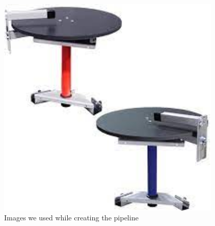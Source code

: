 \begin{figure}[htp]
\centering
\includegraphics[width=0.95\textwidth, angle=0]{Meetings/January/01-21-22/1.21.22 carousel posts - James Hu.jpeg}
\caption{Images we used while creating the pipeline}
\label{fig:012122_1}
\end{figure}



